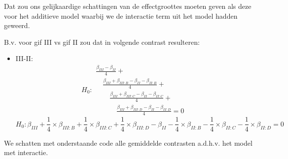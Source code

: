 \documentclass[
  dutch,
  letterpaper,
  12pt]{book}
\providecommand{\tightlist}{%
  \setlength{\itemsep}{0pt}\setlength{\parskip}{0pt}}
\theoremstyle{definition}
\theoremstyle{definition}
\theoremstyle{definition}
\theoremstyle{remark}
\begin{document}
Dat zou ons gelijkaardige schattingen van de effectgroottes moeten geven
als deze voor het additieve model waarbij we de interactie term uit het
model hadden geweerd.

B.v. voor gif III vs gif II zou dat in volgende contrast resulteren:

\begin{itemize}
\tightlist
\item
  III-II: \[H_0: 
  \begin{array}{l}
  \frac{\beta_{III}-\beta_{II}}{4} + \\
  \quad \frac{\beta_{III} + \beta_{III:B}-\beta_{II} - \beta_{II:B}}{4} + \\
  \quad \quad \frac{\beta_{III} + \beta_{III:C}-\beta_{II} - \beta_{II:C}}{4} + \\
  \quad \quad \quad \frac{\beta_{III} + \beta_{III:D}-\beta_{II} - \beta_{II:D}}{4}=0
  \end{array}
  \] \[
  H_0:\beta_{III} + \frac{1}{4} \times \beta_{III:B} +  \frac{1}{4} \times\beta_{III:C} +  \frac{1}{4} \times\beta_{III:D}
  -\beta_{II} - \frac{1}{4} \times\beta_{II:B} -  \frac{1}{4} \times\beta_{II:C}  - \frac{1}{4} \times\beta_{II:D}=0
  \]
\end{itemize}

We schatten met onderstaande code alle gemiddelde contrasten a.d.h.v.
het model met interactie.
\end{document}
